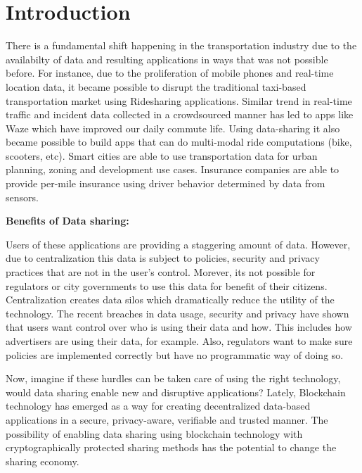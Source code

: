 \section{Introduction}\label{sec:intro}

There is a fundamental shift happening in the transportation industry due to the availabilty of data and resulting
applications in ways that was not possible before. For instance, due to the proliferation of mobile phones and real-time
location data, it became possible to disrupt the traditional taxi-based transportation market using Ridesharing
applications. Similar trend in real-time traffic and incident data collected in a crowdsourced manner has led to apps
like Waze which have improved our daily commute life. Using data-sharing it also became possible to build apps that can
do multi-modal ride computations (bike, scooters, etc). Smart cities are able to use transportation data for
urban planning, zoning and development use cases. Insurance companies are able to provide per-mile insurance using
driver behavior determined by data from sensors.

\noindent
{\bf \textsf Benefits of Data sharing:}


Users of these applications are providing a staggering amount of data. However, due to centralization this data is
subject to policies, security and privacy practices that are not in the user's control. Morever, its not possible for
regulators or city governments to use this data for benefit of their citizens. Centralization creates data silos which
dramatically reduce the utility of the technology. The recent breaches in data usage, security and privacy have shown
that users want control over who is using their data and how. This includes how advertisers are using their data, for
example. Also, regulators want to make sure policies are implemented correctly but have no programmatic way of doing so.

Now, imagine if these hurdles can be taken care of using the right technology, would data sharing enable new and
disruptive applications? Lately, Blockchain technology has emerged as a way for creating decentralized data-based
applications in a secure, privacy-aware, verifiable and trusted manner. The possibility of enabling data sharing using
blockchain technology with cryptographically protected sharing methods has the potential to change the sharing economy.

